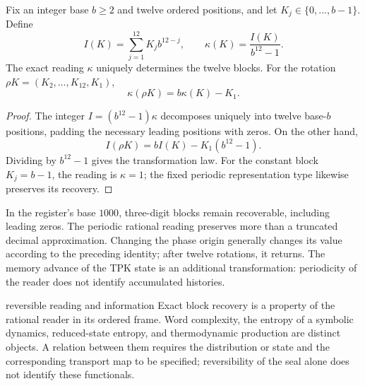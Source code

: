 \begin{proposition}
Fix an integer base $b\ge2$ and twelve ordered positions, and let
$K_j\in\{0,\ldots,b-1\}$. Define
\[
 I(K)=\sum_{j=1}^{12}K_jb^{12-j},\qquad
 \kappa(K)=\frac{I(K)}{b^{12}-1}.
\]
The exact reading $\kappa$ uniquely determines the twelve blocks. For the rotation $\rho K=(K_2,\ldots,K_{12},K_1)$,
\[
 \boxed{\kappa(\rho K)=b\kappa(K)-K_1.}
\]
\end{proposition}
\begin{proof}
The integer $I=(b^{12}-1)\kappa$ decomposes uniquely into twelve base-$b$ positions, padding the necessary leading positions with zeros. On the other hand,
\[
 I(\rho K)=bI(K)-K_1(b^{12}-1).
\]
Dividing by $b^{12}-1$ gives the transformation law. For the constant block $K_j=b-1$, the reading is $\kappa=1$; the fixed periodic representation type likewise preserves its recovery.
\end{proof}

In the register's base $1000$, three-digit blocks remain recoverable, including leading zeros. The periodic rational reading preserves more than a truncated decimal approximation. Changing the phase origin generally changes its value according to the preceding identity; after twelve rotations, it returns. The memory advance of the TPK state is an additional transformation: periodicity of the reader does not identify accumulated histories.

\begin{apunte}{reversible reading and information}
Exact block recovery is a property of the rational reader in its ordered
frame. Word complexity, the entropy of a symbolic dynamics, reduced-state
entropy, and thermodynamic production are distinct objects. A relation
between them requires the distribution or state and the corresponding
transport map to be specified; reversibility of the seal alone does not
identify these functionals.
\end{apunte}


